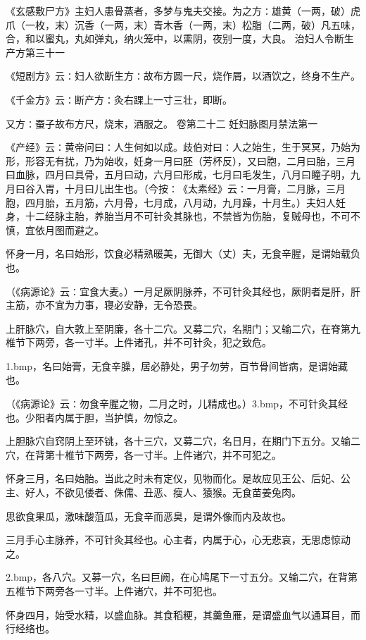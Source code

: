 \documentclass[a4paper,12pt,UTF8,twoside]{ctexbook}
\begin{document}
《玄感敷尸方》主妇人患骨蒸者，多梦与鬼夫交接。为之方∶雄黄（一两，破）虎爪（一枚，末）沉香（一两，末）青木香（一两，末）松脂（二两，破）凡五味，合，和以蜜丸，丸如弹丸，纳火笼中，以熏阴，夜别一度，大良。
治妇人令断生产方第三十一

《短剧方》云∶妇人欲断生方∶故布方圆一尺，烧作屑，以酒饮之，终身不生产。

《千金方》云∶断产方∶灸右踝上一寸三壮，即断。

又方∶蚕子故布方尺，烧末，酒服之。
卷第二十二
妊妇脉图月禁法第一

《产经》云∶黄帝问曰∶人生何如以成。歧伯对曰∶人之始生，生于冥冥，乃始为形，形容无有扰，乃为始收，妊身一月曰胚（芳杯反），又曰胞，二月曰胎，三月曰血脉，四月曰具骨，五月曰动，六月曰形成，七月曰毛发生，八月曰瞳子明，九月曰谷入胃，十月曰儿出生也。（今按∶《太素经》云∶一月膏，二月脉，三月胞，四月胎，五月筋，六月骨，七月成，八月动，九月躁，十月生。）夫妇人妊身，十二经脉主胎，养胎当月不可针灸其脉也，不禁皆为伤胎，复贼母也，不可不慎，宜依月图而避之。

怀身一月，名曰始形，饮食必精熟暖美，无御大（丈）夫，无食辛腥，是谓始载负也。

（《病源论》云∶宜食大麦。）一月足厥阴脉养，不可针灸其经也，厥阴者是肝，肝主筋，亦不宜为力事，寝必安静，无令恐畏。

上肝脉穴，自大敦上至阴廉，各十二穴。又募二穴，名期门；又输二穴，在脊第九椎节下两旁，各一寸半。上件诸孔，并不可针灸，犯之致危。

\pyxfc1.bmp，名曰始膏，无食辛臊，居必静处，男子勿劳，百节骨间皆病，是谓始藏也。

（《病源论》云∶勿食辛腥之物，二月之时，儿精成也。）\pyxfc3.bmp，不可针灸其经也。少阳者内属于胆，当护慎，勿惊之。

上胆脉穴自窍阴上至环铫，各十三穴，又募二穴，名日月，在期门下五分。又输二穴，在背第十椎节下两旁，各一寸半。上件诸穴，并不可犯之。

怀身三月，名曰始胎。当此之时未有定仪，见物而化。是故应见王公、后妃、公主、好人，不欲见偻者、侏儒、丑恶、瘦人、猿猴。无食苗姜兔肉。

思欲食果瓜，激味酸菹瓜，无食辛而恶臭，是谓外像而内及故也。

三月手心主脉养，不可针灸其经也。心主者，内属于心，心无悲哀，无思虑惊动之。

\pyxfc2.bmp，各八穴。又募一穴，名曰巨阙，在心鸠尾下一寸五分。又输二穴，在背第五椎节下两旁各一寸半。上件诸穴，并不可犯也。

怀身四月，始受水精，以盛血脉。其食稻粳，其羹鱼雁，是谓盛血气以通耳目，而行经络也。
\end{document}
